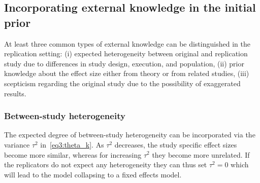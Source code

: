 \subsection{Incorporating external knowledge in the initial prior}
\label{sec3:initialPrior}

At least three common types of external knowledge can be distinguished in the
replication setting: (i) expected heterogeneity between original and replication
study due to differences in study design, execution, and population, (ii) prior
knowledge about the effect size either from theory or from related studies,
(iii) scepticism regarding the original study due to the possibility of
exaggerated results.



\subsubsection{Between-study heterogeneity}
\label{sec3:heterogeneity}
The expected degree of between-study heterogeneity can be incorporated via the
variance $\tau^2$ in~\eqref{eq3:theta_k}. As $\tau^{2}$ decreases, the study
specific effect sizes become more similar, whereas for increasing $\tau^{2}$
they become more unrelated. If the replicators do not expect any heterogeneity
they can thus set $\tau^{2} = 0$ which will lead to the model collapsing to a
fixed effects model.


